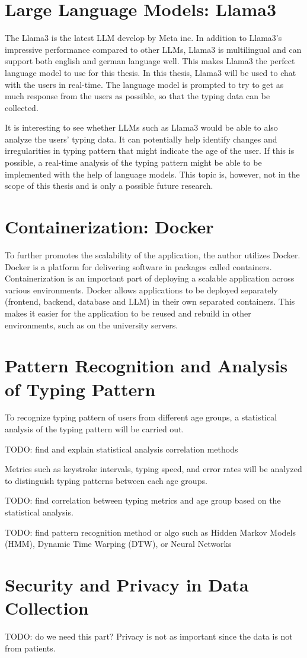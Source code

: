 \section{Large Language Models: Llama3}
The Llama3 is the latest \ac{LLM} develop by Meta inc.
In addition to Llama3's impressive performance compared to other \ac{LLM}s, Llama3 is multilingual and can support both english and german language well.
This makes Llama3 the perfect language model to use for this thesis.
In this thesis, Llama3 will be used to chat with the users in real-time.
The language model is prompted to try to get as much response from the users as possible, so that the typing data can be collected.

It is interesting to see whether \ac{LLM}s such as Llama3 would be able to also analyze the users' typing data.
It can potentially help identify changes and irregularities in typing pattern that might indicate the age of the user.
If this is possible, a real-time analysis of the typing pattern might be able to be implemented with the help of language models.
This topic is, however, not in the scope of this thesis and is only a possible future research.

\section{Containerization: Docker}
To further promotes the scalability of the application, the author utilizes Docker.
Docker is a platform for delivering software in packages called containers.
Containerization is an important part of deploying a scalable application across various environments.
Docker allows applications to be deployed separately (frontend, backend, database and \ac{LLM}) in their own separated containers.
This makes it easier for the application to be reused and rebuild in other environments, such as on the university servers.

\section{Pattern Recognition and Analysis of Typing Pattern}
To recognize typing pattern of users from different age groups, a statistical analysis of the typing pattern will be carried out.

TODO: find and explain statistical analysis correlation methods

Metrics such as keystroke intervals, typing speed, and error rates will be analyzed to distinguish typing patterns between each age groups. 

TODO: find correlation between typing metrics and age group based on the statistical analysis.

TODO: find pattern recognition method or algo such as Hidden Markov Models (HMM), Dynamic Time Warping (DTW), or Neural Networks 

\section{Security and Privacy in Data Collection}
TODO: do we need this part? Privacy is not as important since the data is not from patients.
